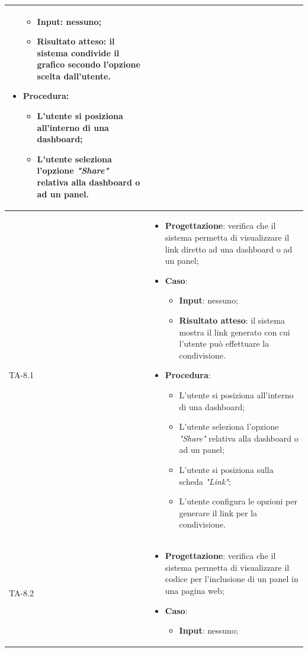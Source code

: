 \begin{longtable}{|C{2.5cm}|C{13cm}|}
\begin{itemize}
	\begin{itemize}
		\item \textbf{Input}: nessuno;
		\item \textbf{Risultato atteso}: il sistema condivide il grafico secondo l'opzione scelta dall'utente.
	\end{itemize}
	\item \textbf{Procedura}:
	\begin{itemize}
		\item L'utente si posiziona all'interno di una dashboard;
		\item L'utente seleziona l'opzione \emph{"Share"} relativa alla dashboard o ad un panel.
	\end{itemize} 
\end{itemize}\\
\hline
{TA-8.1} &
\begin{itemize}
	\item \textbf{Progettazione}: verifica che il sistema permetta di visualizzare il link diretto ad una dashboard o ad un
	panel;
	\item \textbf{Caso}: 
	\begin{itemize}
		\item \textbf{Input}: nessuno;
		\item \textbf{Risultato atteso}: il sistema mostra il link generato con cui l'utente può effettuare la condivisione.
	\end{itemize}
	\item \textbf{Procedura}:
	\begin{itemize}
		\item L'utente si posiziona all'interno di una dashboard;
		\item L'utente seleziona l'opzione \emph{"Share"} relativa alla dashboard o ad un panel;
		\item L'utente si posiziona sulla scheda \emph{"Link"};
		\item L'utente configura le opzioni per generare il link per la condivisione.
	\end{itemize} 
\end{itemize}\\
\hline
{TA-8.2} &
\begin{itemize}
	\item \textbf{Progettazione}: verifica che il sistema permetta di visualizzare il codice per l'inclusione di un panel in una pagina web;
	\item \textbf{Caso}: 
	\begin{itemize}
		\item \textbf{Input}: nessuno;

\end{itemize}
\end{itemize}
\end{longtable}
